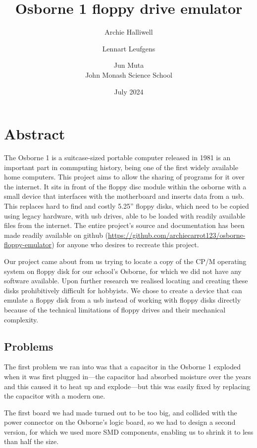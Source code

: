 \documentclass[a4paper]{article}
\begin{document}
\title{Osborne 1 floppy drive emulator}
\date{July 2024}
\author{Archie Halliwell \and Lennart Leufgens \and Jun Muta \\
John Monash Science School}
\maketitle

\section{Abstract}

The Osborne 1 is a suitcase-sized portable computer released in 1981
is an important part in commputing history, being one of the first
widely available home computers. This project aims to allow the
sharing of programs for it over the internet. It sits in front of the
floppy disc module within the osborne with a small device that
interfaces with the motherboard and inserts data from a usb. This
replaces hard to find and costly 5.25'' floppy disks, which need to be
copied using legacy hardware, with usb drives, able to be loaded with
readily available files from the internet. The entire project's source
and documentation has been made readily available on github
(\url{https://github.com/archiecarrot123/osborne-floppy-emulator}) for
anyone who desires to recreate this project.

Our project came about from us trying to locate a copy of the CP/M
operating system on floppy disk for our school's Osborne, for which we
did not have any software available. Upon further research we realised
locating and creating these disks prohibitively difficult for
hobbyists. We chose to create a device that can emulate a floppy disk
from a usb instead of working with floppy disks directly because of
the technical limitations of floppy drives and their mechanical
complexity. 

\subsection{Problems}

The first problem we ran into was that a capacitor in the Osborne 1
exploded when it was first plugged in---the capacitor had absorbed
moisture over the years and this caused it to heat up and
explode---but this was easily fixed by replacing the capacitor with a
modern one.

The first board we had made turned out to be too big, and collided with
the power connector on the Osborne's logic board, so we had to design a second
version, for which we used more SMD components, enabling us to shrink
it to less than half the size.
\end{document}
